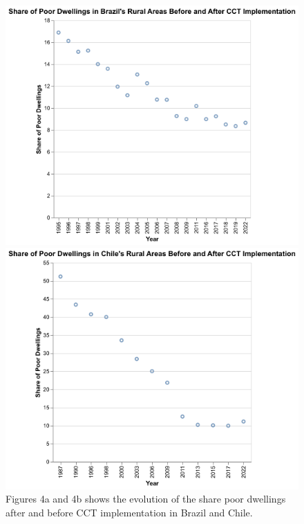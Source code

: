 \documentclass[
  10pt,
]{article}
\begin{document}
\begin{figure}

\begin{minipage}{0.50\linewidth}
\includegraphics{Graphs/dwelling_Brazil.png}\end{minipage}%
%
\begin{minipage}{0.50\linewidth}
\includegraphics{Graphs/dwelling_Chile.png}\end{minipage}%

\caption{\label{fig-combined}Figures 4a and 4b shows the evolution of
the share poor dwellings after and before CCT implementation in Brazil
and Chile.}

\end{figure}%
\end{document}
